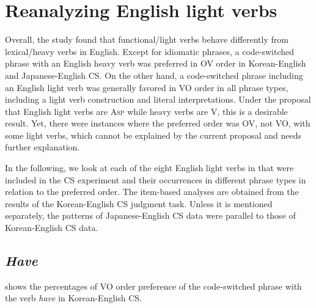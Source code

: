 \section{Reanalyzing English light verbs }\label{ch5:sect:5.7} 

Overall, the study found that functional/light verbs behave differently from lexical/heavy verbs in English. Except for idiomatic phrases, a code-switched phrase with an English heavy verb was preferred in \ac{OV} order in Korean-English and Japanese-English \ac{CS}. On the other hand, a code-switched phrase including an English light verb was generally favored in \ac{VO} order in all phrase types, including a light verb construction and literal interpretations. Under the proposal that English light verbs are \textsc{Asp} while heavy verbs are V, this is a desirable result. Yet, there were instances where the preferred order was \ac{OV}, not \ac{VO}, with some light verbs, which cannot be explained by the current proposal and needs further explanation. 

In the following, we look at each of the eight English light verbs in  that were included in the \ac{CS} experiment and their occurrences in different phrase types in relation to the preferred order. The item-based analyses are obtained from the results of the Korean-English \ac{CS} judgment task. Unless it is mentioned separately, the patterns of Japanese-English \ac{CS} data were parallel to those of Korean-English \ac{CS} data.

\subsection{\textit{Have}}\label{ch5:sect:5.7.1}

 shows the percentages of \ac{VO} order preference of the code-switched phrase with the verb \textit{have} in Korean-English \ac{CS}.

\begin{table}
\caption{Item-based analysis for \textit{have} in Korean-English code-switching
(n$^0$ of occurrence 0–4: \textsc{OV} biased; 5–9: not biased; 10–14: \textsc{VO} biased)
}
\label{tab:5.3}
\end{table}


